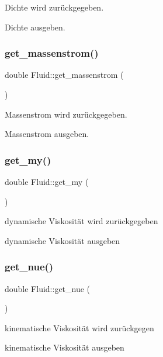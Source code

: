 Dichte wird zurückgegeben. 

Dichte ausgeben. \mbox{\label{class_fluid_afd9451c48ea66d15fdb8226da58da28e}} 
\subsubsection{\texorpdfstring{get\+\_\+massenstrom()}{get\_massenstrom()}}
{\footnotesize\ttfamily double Fluid\+::get\+\_\+massenstrom (\begin{DoxyParamCaption}{ }\end{DoxyParamCaption})}



Massenstrom wird zurückgegeben. 

Massenstrom ausgeben. \mbox{\label{class_fluid_a80d39a71b73f5ac4cffcaceb61b9e0ee}} 
\subsubsection{\texorpdfstring{get\+\_\+my()}{get\_my()}}
{\footnotesize\ttfamily double Fluid\+::get\+\_\+my (\begin{DoxyParamCaption}{ }\end{DoxyParamCaption})}



dynamische Viskosität wird zurückgegeben 

dynamische Viskosität ausgeben \mbox{\label{class_fluid_ae0031c0e8f70a4fb3dacc34c9725c3c1}} 
\subsubsection{\texorpdfstring{get\+\_\+nue()}{get\_nue()}}
{\footnotesize\ttfamily double Fluid\+::get\+\_\+nue (\begin{DoxyParamCaption}{ }\end{DoxyParamCaption})}



kinematische Viskosität wird zurückgegen 

kinematische Viskosität ausgeben \mbox{\label{class_fluid_a60d0c9269a8c8af00bf8828c7f764537}} 
